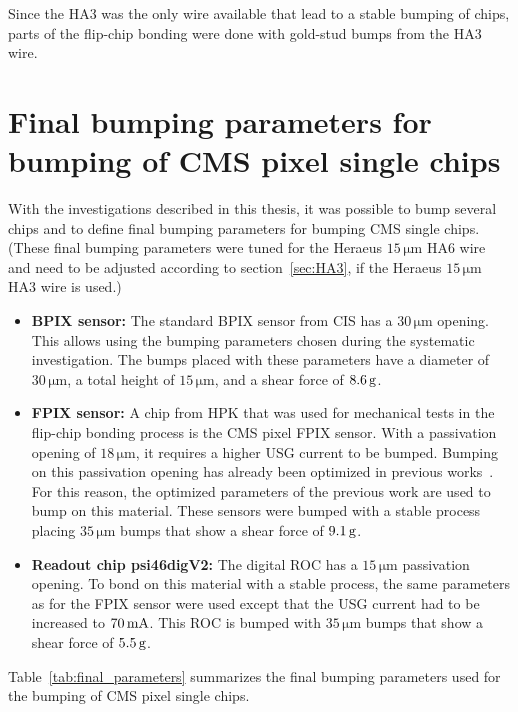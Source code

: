 Since the HA3 was the only wire available that lead to a stable bumping of chips, parts of the flip-chip bonding were done with gold-stud bumps from the HA3 wire.

\section{Final bumping parameters for bumping of \ac{CMS} pixel single chips}
With the investigations described in this thesis, it was possible to bump several chips and to define final bumping parameters for bumping \ac{CMS} single chips. (These final bumping parameters were tuned for the Heraeus $15\,\si{\micro \meter}$ HA6 wire and need to be adjusted according to section~\ref{sec:HA3}, if the Heraeus $15\,\si{\micro \meter}$ HA3 wire is used.)
\begin{itemize}
\item \textbf{\ac{BPIX} sensor:} The standard \ac{BPIX} sensor from CIS has a $30\,\si{\micro \meter}$ opening. This allows using the bumping parameters chosen during the systematic investigation. The bumps placed with these parameters have a diameter of $30\,\si{\micro \meter}$, a total height of $15\,\si{\micro \meter}$, and a shear force of $8.6\,\rm{g}$.
\item \textbf{\ac{FPIX} sensor:} A chip from HPK that was used for mechanical tests in the flip-chip bonding process is the \ac{CMS} pixel \ac{FPIX} sensor. With a passivation opening of $18\,\si{\micro \meter}$, it requires a higher \ac{USG} current to be bumped. Bumping on this passivation opening has already been optimized in previous works~\cite{Hei12}. For this reason, the optimized parameters of the previous work are used to bump on this material. These sensors were bumped with a stable process placing $35\,\si{\micro \meter}$ bumps that show a shear force of $9.1\,\rm{g}$.
\item \textbf{Readout chip psi46digV2:} The digital \acs{ROC} has a $15\,\si{\micro \meter}$ passivation opening. To bond on this material with a stable process, the same parameters as for the \ac{FPIX} sensor were used except that the \ac{USG} current had to be increased to $70\,\rm{mA}$. This \acs{ROC} is bumped with $35\,\si{\micro \meter}$ bumps that show a shear force of $5.5\,\rm{g}$.
\end{itemize}
Table~\ref{tab:final_parameters} summarizes the final bumping parameters used for the bumping of \ac{CMS} pixel single chips.
